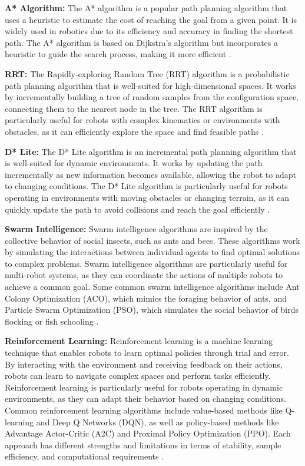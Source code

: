 \documentclass{kththesis}
\begin{document}
\textbf{A* Algorithm:}
The A* algorithm is a popular path planning algorithm that uses a heuristic to estimate the cost of reaching the goal from a given point. It is widely used in robotics due to its efficiency and accuracy in finding the shortest path. The A* algorithm is based on Dijkstra's algorithm but incorporates a heuristic to guide the search process, making it more efficient \parencite{Hart68}. 

\textbf{RRT:}
The Rapidly-exploring Random Tree (RRT) algorithm is a probabilistic path planning algorithm that is well-suited for high-dimensional spaces. It works by incrementally building a tree of random samples from the configuration space, connecting them to the nearest node in the tree. The RRT algorithm is particularly useful for robots with complex kinematics or environments with obstacles, as it can efficiently explore the space and find feasible paths \parencite{lavalle1998rapidly}.

\textbf{D* Lite:}
The D* Lite algorithm is an incremental path planning algorithm that is well-suited for dynamic environments. It works by updating the path incrementally as new information becomes available, allowing the robot to adapt to changing conditions. The D* Lite algorithm is particularly useful for robots operating in environments with moving obstacles or changing terrain, as it can quickly update the path to avoid collisions and reach the goal efficiently \parencite{Koenig02}.

\textbf{Swarm Intelligence:}
Swarm intelligence algorithms are inspired by the collective behavior of social insects, such as ants and bees. These algorithms work by simulating the interactions between individual agents to find optimal solutions to complex problems. Swarm intelligence algorithms are particularly useful for multi-robot systems, as they can coordinate the actions of multiple robots to achieve a common goal. Some common swarm intelligence algorithms include Ant Colony Optimization (ACO), which mimics the foraging behavior of ants, and Particle Swarm Optimization (PSO), which simulates the social behavior of birds flocking or fish schooling \parencite{Dorigo04,Kennedy95}.

\textbf{Reinforcement Learning:}
Reinforcement learning is a machine learning technique that enables robots to learn optimal policies through trial and error. By interacting with the environment and receiving feedback on their actions, robots can learn to navigate complex spaces and perform tasks efficiently. Reinforcement learning is particularly useful for robots operating in dynamic environments, as they can adapt their behavior based on changing conditions. Common reinforcement learning algorithms include value-based methods like Q-learning and Deep Q Networks (DQN), as well as policy-based methods like Advantage Actor-Critic (A2C) and Proximal Policy Optimization (PPO). Each approach has different strengths and limitations in terms of stability, sample efficiency, and computational requirements \parencite{Sutton18, Schulman17}.
\end{document}
